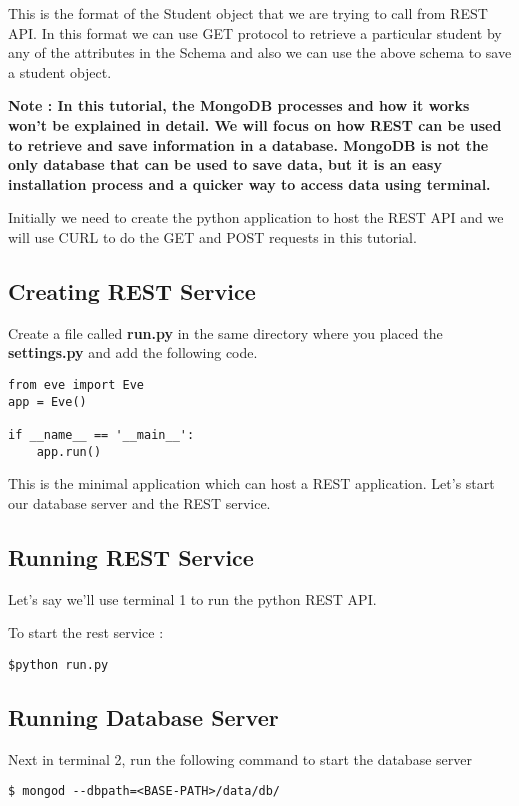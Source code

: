 \documentclass{article}
\begin{document}
This is the format of the Student object that we are trying to call
from REST API. In this format we can use GET protocol to retrieve a
particular student by any of the attributes in the Schema and also we
can use the above schema to save a student object.
\newline

\textbf{Note : In this tutorial, the MongoDB processes and how it
  works won't be explained in detail. We will focus on how REST can be
  used to retrieve and save information in a database. MongoDB is not
  the only database that can be used to save data, but it is an easy
  installation process and a quicker way to access data using
  terminal.  }
\newline

Initially we need to create the python application to host the REST
API and we will use CURL to do the GET and POST requests in this
tutorial.

\subsection{Creating REST Service}

Create a file called \textbf{run.py} in the same directory where you
placed the \textbf{settings.py} and add the following code.

\begin{verbatim}
from eve import Eve
app = Eve()

if __name__ == '__main__':
    app.run()
\end{verbatim}

This is the minimal application which can host a REST
application. Let's start our database server and the REST service.

\subsection{Running REST Service}

Let's say we'll use terminal 1 to run the python REST API.

To start the rest service :
\begin{verbatim}
$python run.py
\end{verbatim}

\subsection{Running Database Server}

Next in terminal 2, run the following command to start the database server
\begin{verbatim}
$ mongod --dbpath=<BASE-PATH>/data/db/
\end{verbatim}
\end{document}
